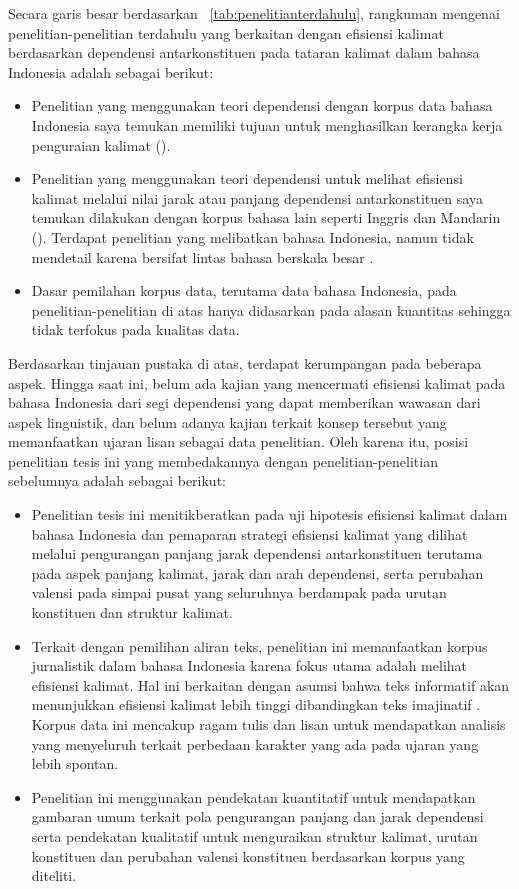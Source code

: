 Secara garis besar berdasarkan \tab~\ref{tab:penelitianterdahulu}, rangkuman mengenai penelitian-penelitian terdahulu yang berkaitan dengan efisiensi kalimat berdasarkan dependensi antarkonstituen pada tataran kalimat dalam bahasa Indonesia adalah sebagai berikut:
\begin{itemize}
\item Penelitian yang menggunakan teori dependensi dengan korpus data bahasa Indonesia saya temukan memiliki tujuan untuk menghasilkan kerangka kerja penguraian kalimat (\citealp{kamayani2011dependency, green2012indonesian, irmawati2015dependency}).
\item Penelitian yang menggunakan teori dependensi untuk melihat efisiensi kalimat melalui nilai jarak atau panjang dependensi antarkonstituen saya temukan dilakukan dengan korpus bahasa lain seperti Inggris dan Mandarin (\citealp{jiang2015effects, wang2017effects}). Terdapat penelitian yang melibatkan bahasa Indonesia, namun tidak mendetail karena bersifat lintas bahasa berskala besar \citep{futrell2015large}.
\item Dasar pemilahan korpus data, terutama data bahasa Indonesia, pada penelitian-penelitian di atas hanya didasarkan pada alasan kuantitas sehingga tidak terfokus pada kualitas data. 
\end{itemize}
Berdasarkan tinjauan pustaka di atas, terdapat kerumpangan pada beberapa aspek. Hingga saat ini, belum ada kajian yang mencermati efisiensi kalimat pada bahasa Indonesia dari segi dependensi yang dapat memberikan wawasan dari aspek linguistik, dan belum adanya kajian terkait konsep tersebut yang memanfaatkan ujaran lisan sebagai data penelitian. Oleh karena itu, posisi penelitian tesis ini yang membedakannya dengan penelitian-penelitian sebelumnya adalah sebagai berikut:
\begin{itemize}
\item Penelitian tesis ini menitikberatkan pada uji hipotesis efisiensi kalimat dalam bahasa Indonesia dan pemaparan strategi efisiensi kalimat yang dilihat melalui pengurangan panjang jarak dependensi antarkonstituen terutama pada aspek panjang kalimat, jarak dan arah dependensi, serta perubahan \gls{valensi} pada simpai pusat yang seluruhnya berdampak pada urutan konstituen dan struktur kalimat.
\item Terkait dengan pemilihan aliran teks, penelitian ini memanfaatkan korpus jurnalistik dalam bahasa Indonesia karena fokus utama adalah melihat efisiensi kalimat. Hal ini berkaitan dengan asumsi bahwa teks informatif akan menunjukkan efisiensi kalimat lebih tinggi dibandingkan teks imajinatif \citep{wang2017effects}. Korpus data ini mencakup ragam tulis dan lisan untuk mendapatkan analisis yang menyeluruh terkait perbedaan karakter yang ada pada ujaran yang lebih spontan.
\item Penelitian ini menggunakan pendekatan kuantitatif untuk mendapatkan gambaran umum terkait pola pengurangan panjang dan jarak dependensi serta pendekatan kualitatif untuk menguraikan struktur kalimat, urutan konstituen dan perubahan valensi konstituen berdasarkan korpus yang diteliti.
\end{itemize}

